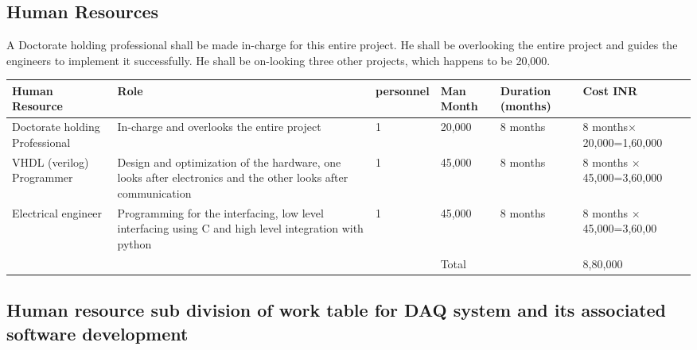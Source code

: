 \documentclass{FR16}
\begin{document}
\newpage

\subsection{Human Resources}
A Doctorate holding professional shall be made in-charge for this entire project. He shall be overlooking the entire project and guides the engineers to implement it successfully. He shall be on-looking three other projects, which happens to be 20,000. 
\begin{center}
\begin{tabular}{||p{2 cm} ||p{3 cm}||p{1.5 cm}|| p{1.5 cm}|| p{2 cm}||p{3 cm}|| }
\arrayrulecolor{Azzurro}
\hline
\hline

{\bfseries Human Resource } & {\bfseries Role} & {\bfseries personnel}&{\bfseries Man Month}& {\bfseries Duration (months)} & {\bfseries Cost INR} \\
\hline
\hline
 Doctorate holding Professional  & In-charge and overlooks the entire project &1 & 20,000 & 8 months & 8 months$\times$ 20,000=1,60,000\\
\hline
\hline
VHDL (verilog) Programmer& Design and optimization of the hardware, one looks after electronics and the other looks after communication  &1 & 45,000 & 8 months & 8 months $\times$ 45,000=3,60,000\\
\hline
\hline
Electrical engineer &Programming for the interfacing, low level interfacing using C and high level integration with python  &1 & 45,000 & 8 months & 8 months $\times$ 45,000=3,60,00\\
\hline
\hline
& & & Total & & 8,80,000
\end{tabular}
\end{center}

\newpage
\subsection{Human resource sub division of work table for DAQ system and its associated software development}
\end{document}
